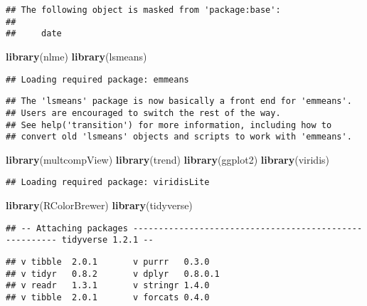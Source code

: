 \documentclass[]{article}
\newenvironment{Shaded}{\begin{snugshade}}{\end{snugshade}}
\newcommand{\KeywordTok}[1]{\textcolor[rgb]{0.13,0.29,0.53}{\textbf{#1}}}
\newcommand{\NormalTok}[1]{#1}
\begin{document}
\begin{verbatim}
## The following object is masked from 'package:base':
## 
##     date
\end{verbatim}

\begin{Shaded}
\begin{Highlighting}[]
\KeywordTok{library}\NormalTok{(nlme)}
\KeywordTok{library}\NormalTok{(lsmeans)}
\end{Highlighting}
\end{Shaded}

\begin{verbatim}
## Loading required package: emmeans
\end{verbatim}

\begin{verbatim}
## The 'lsmeans' package is now basically a front end for 'emmeans'.
## Users are encouraged to switch the rest of the way.
## See help('transition') for more information, including how to
## convert old 'lsmeans' objects and scripts to work with 'emmeans'.
\end{verbatim}

\begin{Shaded}
\begin{Highlighting}[]
\KeywordTok{library}\NormalTok{(multcompView)}
\KeywordTok{library}\NormalTok{(trend)}
\KeywordTok{library}\NormalTok{(ggplot2)}
\KeywordTok{library}\NormalTok{(viridis)}
\end{Highlighting}
\end{Shaded}

\begin{verbatim}
## Loading required package: viridisLite
\end{verbatim}

\begin{Shaded}
\begin{Highlighting}[]
\KeywordTok{library}\NormalTok{(RColorBrewer)}
\KeywordTok{library}\NormalTok{(tidyverse)}
\end{Highlighting}
\end{Shaded}

\begin{verbatim}
## -- Attaching packages ------------------------------------------------------- tidyverse 1.2.1 --
\end{verbatim}

\begin{verbatim}
## v tibble  2.0.1       v purrr   0.3.0  
## v tidyr   0.8.2       v dplyr   0.8.0.1
## v readr   1.3.1       v stringr 1.4.0  
## v tibble  2.0.1       v forcats 0.4.0
\end{verbatim}
\end{document}
